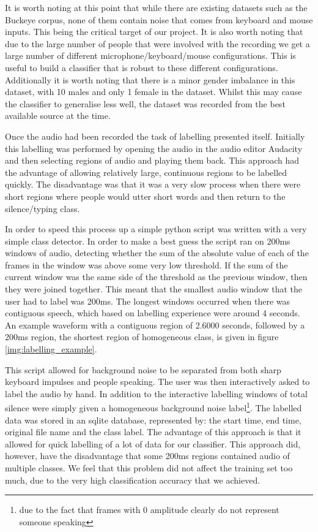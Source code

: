 \documentclass[ %
                    author={Sam Phippen},
                supervisor={Dr. Rafal Bogacz},
                     title={Real time voice activity detectors in noisy personal computing environments},
                  subtitle={},
                    degree={MEng},
                      year={2012} ]{thesis}
\begin{document}
It is worth noting at this point that while there are existing datasets such as
the Buckeye corpus\cite{buckeye}, none of them contain noise that comes from
keyboard and mouse inputs. This being the critical target of our project. It is
also worth noting that due to the large number of people that were involved
with the recording we get a large number of different microphone/keyboard/mouse
configurations. This is useful to build a classifier that is robust to these
different configurations. Additionally it is worth noting that there is a minor
gender imbalance in this dataset, with 10 males and only 1 female in the
dataset. Whilst this may cause the classifier to generalise less well, the
dataset was recorded from the best available source at the time.

Once the audio had been recorded the task of labelling presented itself.
Initially this labelling was performed by opening the audio in the audio editor
Audacity\cite{audacity} and then selecting regions of audio and playing them
back. This approach had the advantage of allowing relatively large, continuous
regions to be labelled quickly. The disadvantage was that it was a very slow
process when there were short regions where people would utter short words and
then return to the silence/typing class.

In order to speed this process up a simple python script was written with a
very simple class detector. In order to make a best guess the script ran on
200ms windows of audio, detecting whether the sum of the absolute value of each
of the frames in the window was above some very low threshold. If the sum of
the current window was the same side of the threshold as the previous window,
then they were joined together. This meant that the smallest audio window that
the user had to label was 200ms. The longest windows occurred when there was
contiguous speech, which based on labelling experience were around 4 seconds.
An example waveform with a contiguous region of 2.6000 seconds, followed by a
200ms region, the shortest region of homogeneous class, is given in figure
\ref{img:labelling_example}.

This script allowed for background noise to be separated from both sharp
keyboard impulses and people speaking. The user was then interactively asked to
label the audio by hand. In addition to the interactive labelling windows of
total silence were simply given a homogeneous background noise
label\footnote{due to the fact that frames with 0 amplitude clearly do not
represent someone speaking}. The labelled data was stored in an sqlite
database, represented by: the start time, end time, original file name and the
class label. The advantage of this approach is that it allowed for quick
labelling of a lot of data for our classifier. This approach did, however, have
the disadvantage that some 200ms regions contained audio of multiple classes.
We feel that this problem did not affect the training set too much, due to the
very high classification accuracy that we achieved.
\end{document}
